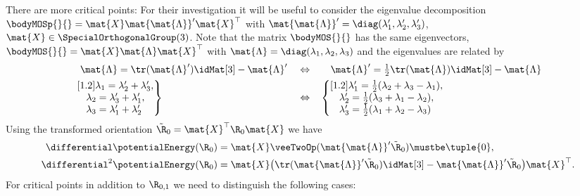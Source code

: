 \begin{Example}
There are more critical points:
For their investigation it will be useful to consider the eigenvalue decomposition $\bodyMOSp{}{} = \mat{X} \mat{\mat{\Lambda}}' \mat{X}^\top$ with $\mat{\mat{\Lambda}}' = \diag(\lambda_1', \lambda_2', \lambda_3')$, $\mat{X} \in \SpecialOrthogonalGroup(3)$.
Note that the matrix $\bodyMOS{}{}$ has the same eigenvectors, \ie $\bodyMOS{}{} = \mat{X} \mat{\Lambda} \mat{X}^\top$ with $\mat{\Lambda} = \diag(\lambda_1, \lambda_2, \lambda_3)$ and the eigenvalues are related by
\begin{subequations}
\begin{align}\label{eq:EigenvaluesKappa}
 &\hspace{.6em}\mat{\Lambda} = \tr(\mat{\Lambda}') \idMat[3] - \mat{\Lambda}'&
&\Leftrightarrow&
 &\hspace{1.1em}\mat{\Lambda}' = \tfrac{1}{2}\tr(\mat{\Lambda}) \idMat[3] - \mat{\Lambda}
\\
 &\left.\begin{matrix}[1.2]
 \lambda_1 = \lambda_2' + \lambda_3', \\
 \lambda_2 = \lambda_3' + \lambda_1', \\
 \lambda_3 = \lambda_1' + \lambda_2'\hphantom{,}  
 \end{matrix}\right\}&
&\Leftrightarrow&
 &\left\{\begin{matrix}[1.2]
 \lambda_1' = \tfrac{1}{2} (\lambda_2 + \lambda_3 - \lambda_1), \\
 \lambda_2' = \tfrac{1}{2} (\lambda_3 + \lambda_1 - \lambda_2), \\
 \lambda_3' = \tfrac{1}{2} (\lambda_1 + \lambda_2 - \lambda_3)\hphantom{,}  
 \end{matrix}\right.
\end{align} 
\end{subequations}
Using the transformed orientation $\tilde{\R}_0 = \mat{X}^\top \R_0 \mat{X}$ we have
\begin{subequations}
\begin{align}
 \differential \potentialEnergy (\R_0) &= \mat{X} \veeTwoOp(\mat{\mat{\Lambda}}' \tilde{\R}_0) \mustbe \tuple{0},
\\
 \differential^2 \potentialEnergy (\R_0) &= \mat{X} \big( \tr (\mat{\mat{\Lambda}}' \tilde{\R}_0) \idMat[3] - \mat{\mat{\Lambda}}' \tilde{\R}_0 \big) \mat{X}^\top.
\end{align}
\end{subequations}
For critical points in addition to $\R_{0,1}$ we need to distinguish the following cases:
\begin{itemize}

\end{itemize}
\end{Example}
